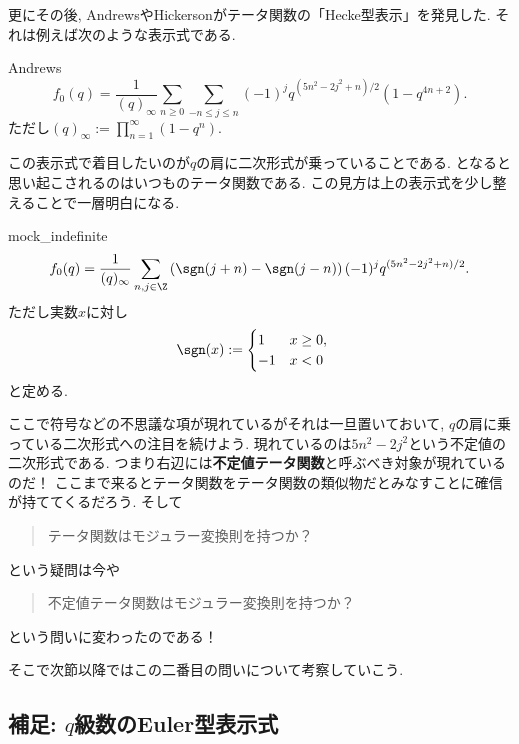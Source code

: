\documentclass[11pt,b5paper,oneside,lualatex]{ltjsarticle} %
\numberwithin{equation}{section} %
\begin{document}
更にその後, AndrewsやHickersonがテータ関数の「Hecke型表示」を発見した. 
それは例えば次のような表示式である. 

\begin{thm}{Andrews~{\cite[Equation (1.4)]{Andrews_5_7}}}{}
	\[
	f_0 (q) = \frac{1}{(q)_\infty}
	\sum_{n \ge 0} \sum_{-n \le j \le n} (-1)^j q^{(5n^2 - 2j^2 + n)/2} (1 - q^{4n+2}).
	\]
	ただし$ (q)_\infty := \prod_{n=1}^{\infty} (1 - q^n) $.
\end{thm}

この表示式で着目したいのが$ q $の肩に二次形式が乗っていることである. 
となると思い起こされるのはいつものテータ関数である. 
この見方は上の表示式を少し整えることで一層明白になる. 

\begin{cor}{}{mock_indefinite}
	\[
	f_0 (q) = \frac{1}{(q)_\infty}
	\sum_{n, j \in \Z} \left( \sgn(j+n) - \sgn(j-n) \right) (-1)^j q^{(5n^2 - 2j^2 + n)/2}.
	\]	
	ただし実数$ x $に対し
	\begin{align}
		\sgn(x) &:= 
		\begin{cases}
			1 & x \ge 0, \\
			-1 & x < 0
		\end{cases}
	\end{align}
	と定める. 
\end{cor}

ここで符号などの不思議な項が現れているがそれは一旦置いておいて, $ q $の肩に乗っている二次形式への注目を続けよう. 
現れているのは$ 5n^2 - 2j^2 $という不定値の二次形式である. 
つまり右辺には\textbf{不定値テータ関数}と呼ぶべき対象が現れているのだ！
ここまで来るとテータ関数をテータ関数の類似物だとみなすことに確信が持ててくるだろう. 
そして
\begin{quote}
	\centering
	テータ関数はモジュラー変換則を持つか？
\end{quote}
という疑問は今や
\begin{quote}
	\centering
	不定値テータ関数はモジュラー変換則を持つか？
\end{quote}
という問いに変わったのである！

そこで次節以降ではこの二番目の問いについて考察していこう. 


\subsection{補足: $ q $級数のEuler型表示式} \label{subsec:Eulerian_form}
\end{document}
